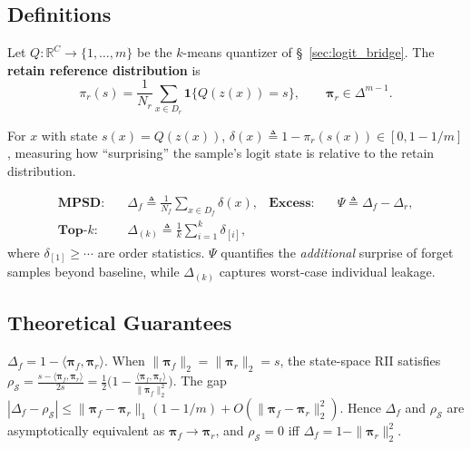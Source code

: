 \documentclass[smallextended]{svjour3}       %
\newcommand{\coloneqq}{\triangleq}
\begin{document}
\subsection{Definitions}

Let $Q:\mathbb{R}^C\to\{1,\dots,m\}$ be the $k$-means quantizer of \S\ \ref{sec:logit_bridge}. The \textbf{retain reference distribution} is
\begin{equation}
\pi_r(s) = \frac{1}{N_r}\sum_{x\in D_r}\mathbf{1}\{Q(z(x))=s\}, \qquad \boldsymbol{\pi}_r\in\Delta^{m-1}.
\end{equation}

\begin{definition}
\label{def:isd}
For $x$ with state $s(x)=Q(z(x))$, $\delta(x)\coloneqq 1-\pi_r(s(x))\in[0,1-1/m]$, measuring how ``surprising'' the sample's logit state is relative to the retain distribution.
\end{definition}

\begin{definition}
\label{def:pssd_agg}
\begin{align}
\textbf{MPSD:}\quad &\Delta_f \coloneqq \frac{1}{N_f}\sum_{x\in D_f}\delta(x), &
\textbf{Excess:}\quad &\Psi \coloneqq \Delta_f - \Delta_r,\\
\textbf{Top-$k$:}\quad &\Delta_{(k)} \coloneqq \frac{1}{k}\sum_{i=1}^k\delta_{[i]},
\end{align}
where $\delta_{[1]}\ge\cdots$ are order statistics. $\Psi$ quantifies the \emph{additional} surprise of forget samples beyond baseline, while $\Delta_{(k)}$ captures worst-case individual leakage.
\end{definition}

\subsection{Theoretical Guarantees}

\begin{proposition}
\label{prop:pssd_rii}
$\Delta_f = 1-\langle\boldsymbol{\pi}_f,\boldsymbol{\pi}_r\rangle$. When $\|\boldsymbol{\pi}_f\|_2=\|\boldsymbol{\pi}_r\|_2=s$, the state-space RII satisfies $\rho_{\mathcal{S}}=\frac{s-\langle\boldsymbol{\pi}_f,\boldsymbol{\pi}_r\rangle}{2s}=\frac{1}{2}\bigl(1-\frac{\langle\boldsymbol{\pi}_f,\boldsymbol{\pi}_r\rangle}{\|\boldsymbol{\pi}_f\|_2^2}\bigr)$. The gap $|\Delta_f-\rho_{\mathcal{S}}|\le\|\boldsymbol{\pi}_f-\boldsymbol{\pi}_r\|_1(1-1/m)+O(\|\boldsymbol{\pi}_f-\boldsymbol{\pi}_r\|_2^2)$. Hence $\Delta_f$ and $\rho_{\mathcal{S}}$ are asymptotically equivalent as $\boldsymbol{\pi}_f\to\boldsymbol{\pi}_r$, and $\rho_{\mathcal{S}}=0$ iff $\Delta_f = 1-\|\boldsymbol{\pi}_r\|_2^2$.
\end{proposition}
\end{document}
